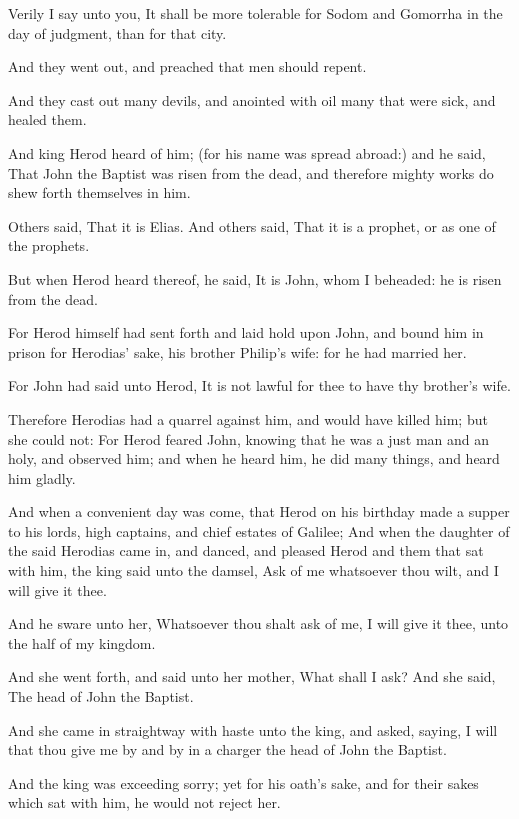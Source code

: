 Verily I say unto you, It shall be more tolerable for Sodom and Gomorrha in the day of judgment, than for that city.

\Verse And they went out, and preached that men should repent.

\Verse And they cast out many devils, and anointed with oil many that were sick, and healed them.

\Verse And king Herod heard of him; (for his name was spread abroad:) and he said, That John the Baptist was risen from the dead, and therefore mighty works do shew forth themselves in him.

\Verse Others said, That it is Elias. And others said, That it is a prophet, or as one of the prophets.

\Verse But when Herod heard thereof, he said, It is John, whom I beheaded: he is risen from the dead.

\Verse For Herod himself had sent forth and laid hold upon John, and bound him in prison for Herodias' sake, his brother Philip's wife: for he had married her.

\Verse For John had said unto Herod, It is not lawful for thee to have thy brother's wife.

\Verse Therefore Herodias had a quarrel against him, and would have killed him; but she could not: \Verse For Herod feared John, knowing that he was a just man and an holy, and observed him; and when he heard him, he did many things, and heard him gladly.

\Verse And when a convenient day was come, that Herod on his birthday made a supper to his lords, high captains, and chief estates of Galilee; \Verse And when the daughter of the said Herodias came in, and danced, and pleased Herod and them that sat with him, the king said unto the damsel, Ask of me whatsoever thou wilt, and I will give it thee.

\Verse And he sware unto her, Whatsoever thou shalt ask of me, I will give it thee, unto the half of my kingdom.

\Verse And she went forth, and said unto her mother, What shall I ask?  And she said, The head of John the Baptist.

\Verse And she came in straightway with haste unto the king, and asked, saying, I will that thou give me by and by in a charger the head of John the Baptist.

\Verse And the king was exceeding sorry; yet for his oath's sake, and for their sakes which sat with him, he would not reject her.

